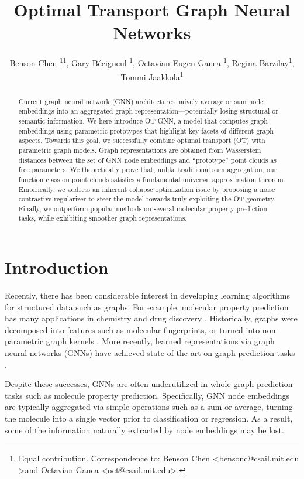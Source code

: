 \documentclass[letterpaper]{article} \usepackage{aaai22}  \usepackage{times}  \usepackage{helvet}  \usepackage{courier}  \usepackage[hyphens]{url}  \usepackage{graphicx} \urlstyle{rm} \def\UrlFont{\rm}  \usepackage{natbib}  \usepackage{caption} \DeclareCaptionStyle{ruled}{labelfont=normalfont,labelsep=colon,strut=off} \frenchspacing  \setlength{\pdfpagewidth}{8.5in}  \setlength{\pdfpageheight}{11in}  \usepackage{algorithm}
\title{Optimal Transport Graph Neural Networks}
\author{
    Benson Chen \textsuperscript{\rm 1}\thanks{Equal contribution. Correspondence to:
Benson Chen \textless bensonc@csail.mit.edu \textgreater and Octavian Ganea \textless oct@csail.mit.edu\textgreater.}, Gary B{\'e}cigneul \textsuperscript{\rm 1}\printfnsymbol{1}, Octavian-Eugen Ganea \textsuperscript{\rm 1}\printfnsymbol{1}, Regina Barzilay\textsuperscript{\rm 1}, Tommi Jaakkola\textsuperscript{\rm 1}
}
\begin{document}
\maketitle

\begin{abstract}
Current graph neural network (GNN) architectures naively average or sum node embeddings into an aggregated graph representation---potentially losing structural or semantic information. We here introduce \textsc{OT-GNN}, a model that computes graph embeddings using parametric prototypes that highlight key facets of different graph aspects. Towards this goal, we  successfully combine optimal transport (OT) with parametric graph models. Graph representations are obtained from Wasserstein distances between the set of GNN node embeddings and ``prototype'' point clouds as free parameters. We theoretically prove that, unlike traditional sum aggregation, our function class on point clouds satisfies a fundamental universal approximation theorem. Empirically, we address an inherent collapse optimization issue by proposing a noise contrastive regularizer to steer the model towards truly exploiting the OT geometry. Finally, we outperform popular methods on several molecular property prediction tasks, while exhibiting smoother graph representations.
\end{abstract}


\section{Introduction} 
Recently, there has been considerable interest in developing learning algorithms for structured data such as graphs. For example, molecular property prediction has many applications in chemistry and drug discovery \citep{yang2019analyzing,vamathevan2019applications}. Historically, graphs were decomposed into features such as molecular fingerprints, or turned into non-parametric graph kernels \citep{vishwanathan2010graph,shervashidze2011weisfeiler}. More recently, learned  representations via graph neural networks (GNNs) have achieved state-of-the-art on graph prediction tasks \citep{duvenaud2015convolutional,NIPS2016_6081,kipf2016semi,yang2019analyzing}.

Despite these successes, GNNs are often underutilized in whole graph prediction tasks such as molecule property prediction. Specifically, GNN node embeddings are typically aggregated via simple operations such as a sum or average, turning the molecule into a single vector prior to classification or regression. As a result, some of the information naturally extracted by node embeddings may be lost.  
\end{document}
